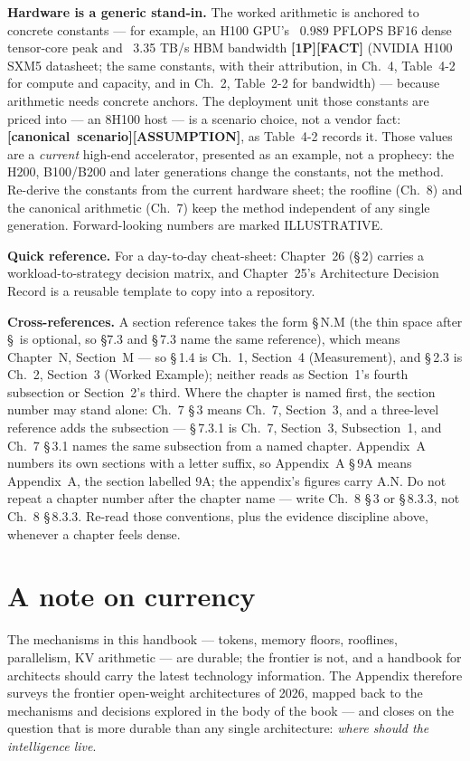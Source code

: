 \textbf{Hardware is a generic stand-in.} The worked arithmetic is anchored to
concrete constants --- for example, an H100 GPU's ~0.989 PFLOPS BF16 dense
tensor-core peak and ~3.35 TB/s HBM bandwidth \textbf{[1P][FACT]} (NVIDIA
H100 SXM5 datasheet; the same constants, with their attribution, in Ch.~4,
Table~4-2 for compute and capacity, and in Ch.~2, Table~2-2 for bandwidth)
--- because arithmetic needs concrete anchors. The deployment
unit those constants are priced into --- an 8\texttimes H100 host --- is a
scenario choice, not a vendor fact:
\textbf{\mbox{[canonical scenario]}\hspace{0pt}\mbox{[ASSUMPTION]}}, as
Table~4-2 records it. Those values are a \emph{current} high-end
accelerator, presented as an example, not a prophecy: the H200, B100/B200
and later generations
change the constants, not the method. Re-derive the constants from the
current hardware sheet; the roofline (Ch.~8) and the canonical arithmetic
(Ch.~7) keep the method independent of any single generation. Forward-looking
numbers are marked ILLUSTRATIVE.

\textbf{Quick reference.} For a day-to-day cheat-sheet: Chapter~26 (\S\,2)
carries a workload-to-strategy decision matrix, and Chapter~25's Architecture
Decision Record is a reusable template to copy into a repository.

\textbf{Cross-references.} A section reference takes the form \S\,N.M (the thin space after \S\ is optional, so \S7.3 and \S\,7.3 name the same reference), which means Chapter~N, Section~M --- so \S\,1.4 is Ch.~1, Section~4 (Measurement), and \S\,2.3 is Ch.~2, Section~3 (Worked Example); neither reads as Section~1's fourth subsection or Section~2's third. Where the chapter is named first, the section number may stand alone: Ch.~7 \S\,3 means Ch.~7, Section~3, and a three-level reference adds the subsection --- \S\,7.3.1 is Ch.~7, Section~3, Subsection~1, and Ch.~7 \S\,3.1 names the same subsection from a named chapter. Appendix~A numbers its own sections with a letter suffix, so Appendix~A \S\,9A means Appendix~A, the section labelled 9A; the appendix's figures carry A.N. Do not repeat a chapter number after the chapter name --- write Ch.~8 \S\,3 or \S\,8.3.3, not Ch.~8 \S\,8.3.3. Re-read those conventions, plus the evidence discipline above, whenever a chapter feels dense.

\section*{A note on currency}

The mechanisms in this handbook --- tokens, memory floors, rooflines,
parallelism, KV arithmetic --- are durable; the frontier is not, and a
handbook for architects should carry the latest technology information. The
Appendix therefore
surveys the frontier open-weight architectures of 2026, mapped back to the
mechanisms and decisions explored in the body of the book --- and closes on
the question that is more durable than any single architecture: \emph{where
should the intelligence live}.

\renewcommand{\thefigure}{\thechapter.\arabic{figure}}